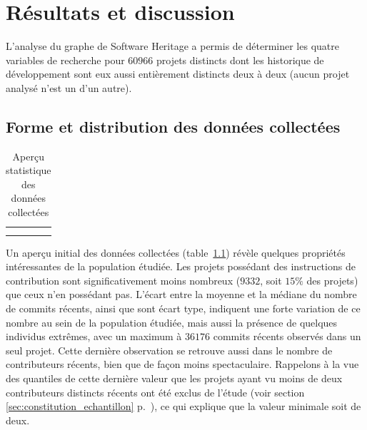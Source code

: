\chapter{Résultats et discussion}
\label{chap:results}

\captionsetup[figure]{format=plain,singlelinecheck=true,justification=centering}
\captionsetup[subfigure]{format=plain,singlelinecheck=true,justification=centering}
\captionsetup[table]{format=plain,singlelinecheck=true,justification=centering}

L'analyse du graphe de Software Heritage a permis de déterminer les quatre variables de recherche pour
$60 966$ projets distincts dont les historique de développement sont eux aussi entièrement distincts deux à
deux (aucun projet analysé n'est un  d'un autre).

\section{Forme et distribution des données collectées}

\begin{table}[ht]
    \centering
    \begin{tabular}{cc}
         &
        
        \\
         &
        
    \end{tabular}
    \caption{Aperçu statistique des données collectées}
    \label{tab:data_description}
\end{table}

Un aperçu initial des données collectées (table~\ref{tab:data_description}) révèle quelques propriétés
intéressantes de la population étudiée. Les projets possédant des instructions de contribution sont
significativement moins nombreux ($9 332$, soit $15\%$ des projets) que ceux n'en possédant pas. L'écart entre
la moyenne et la médiane du nombre de \glspl{commit} récents, ainsi que sont écart type, indiquent une forte
variation de ce nombre au sein de la population étudiée, mais aussi la présence de quelques individus
extrêmes, avec un maximum à $36 176$ \glspl{commit} récents observés dans un seul projet. Cette dernière
observation se retrouve aussi dans le nombre de contributeurs récents, bien que de façon moins spectaculaire.
Rappelons à la vue des quantiles de cette dernière valeur que les projets ayant vu moins de deux contributeurs
distincts récents ont été exclus de l'étude (voir section \ref{sec:constitution_echantillon}
p.~\pageref{sec:constitution_echantillon}), ce qui explique que la valeur minimale soit de deux.

